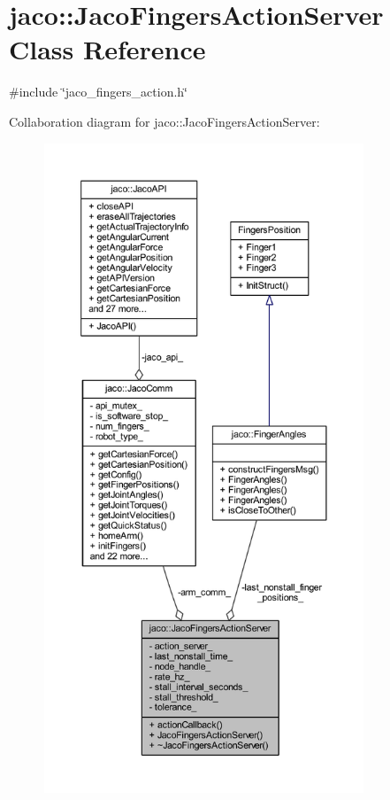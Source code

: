 \hypertarget{classjaco_1_1JacoFingersActionServer}{}\section{jaco\+:\+:Jaco\+Fingers\+Action\+Server Class Reference}
\label{classjaco_1_1JacoFingersActionServer}


{\ttfamily \#include \char`\"{}jaco\+\_\+fingers\+\_\+action.\+h\char`\"{}}



Collaboration diagram for jaco\+:\+:Jaco\+Fingers\+Action\+Server\+:
\nopagebreak
\begin{figure}[H]
\begin{center}
\leavevmode
\includegraphics[height=550pt]{d6/d35/classjaco_1_1JacoFingersActionServer__coll__graph}
\end{center}
\end{figure}
